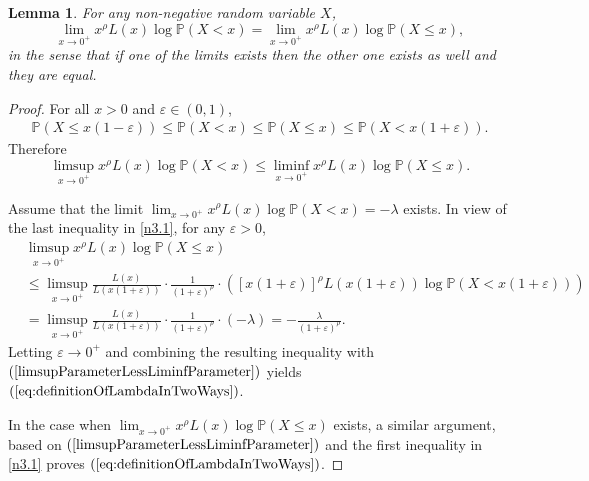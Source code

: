\documentclass[bj]{imsart}
\numberwithin{equation}{section}
\renewcommand{\P}{\mathbb{P}}
\newcommand{\1}{\mathbf{1}}
\newtheorem{lemma}[thm]{Lemma}
\theoremstyle{definition}
\newcommand{\eps}{\varepsilon}
\begin{document}
\begin{lemma}\label{propo:limitsEquality}
For any non-negative random variable $X$, 
\begin{equation}
\lim_{x\to 0^+}x^\rho L(x)\log \P(X<x)=\lim_{x\to 0^+}x^\rho L(x)\log \P(X\leq x) ,\label{eq:definitionOfLambdaInTwoWays}
\end{equation}
in the sense that if one of the  limits exists then the other one exists as well and they are equal.
\end{lemma}

\begin{proof}
For all $x>0$ and $\eps\in(0,1)$, 
\begin{align}\label{n3.1}
\P(X\leq x(1-\varepsilon)) \leq
\P(X<x) \leq \P(X\leq x)
\leq \P(X<x(1+\varepsilon)).
\end{align}
Therefore
\begin{equation} \label{limsupParameterLessLiminfParameter}
 \limsup_{x\to 0^+}x^{\rho}L(x)\log \P(X<x) \leq \liminf_{x\to 0^+} x^{\rho}L(x)\log \P(X\leq x).
\end{equation}

Assume that the limit $\lim_{x\to 0^+}x^{\rho}L(x)\log \P(X<x)=-\lambda$ exists. In view of the last inequality in \eqref{n3.1},  for any  $\varepsilon >0$,
\begin{align*}
&\limsup_{x\to 0^+} x^\rho L(x)\log \P(X\leq x) \\
&\leq 
\limsup_{x\to 0^+}\frac{L(x)}{L(x(1+\varepsilon))}\cdot \frac 1 {(1+\eps)^\rho}
\cdot\left( [x(1+\varepsilon)]^\rho L(x(1+\varepsilon))\log \P(X<x(1+\varepsilon)) \right)\\
&= 
\limsup_{x\to 0^+}\frac{L(x)}{L(x(1+\varepsilon))}\cdot \frac 1 {(1+\eps)^\rho}
\cdot(-\lambda)
=
-\frac{\lambda}{(1+\varepsilon)^\rho}.
\end{align*}
 Letting $\varepsilon\to 0^+$ and combining the resulting inequality with 
$(\ref{limsupParameterLessLiminfParameter})$ yields $(\ref{eq:definitionOfLambdaInTwoWays})$.

In the case when $\lim_{x\to 0^+}x^\rho L(x)\log \P(X\leq x)$ exists,
 a similar argument, based on  $(\ref{limsupParameterLessLiminfParameter})$ and the 
 first inequality in \eqref{n3.1}
 proves $(\ref{eq:definitionOfLambdaInTwoWays})$. 
\end{proof}
\end{document}
